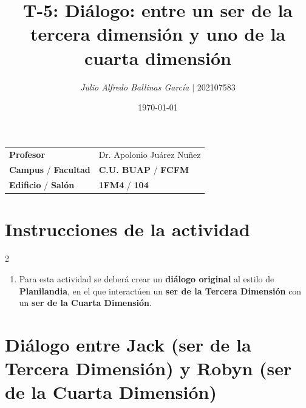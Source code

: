 \documentclass{article}
\title{ \textcolor{Tarawera}{\textbf{T-\textcolor{Sun}{\textbf{5}}}}: \textcolor{Apple Green}{\textbf{\textcolor{orange(colorwheel)}{\textbf{Diálogo}}: entre un ser de la \textcolor{Cinnabar}{\textbf{tercera dimensión}} y uno de la \textcolor{Tuscany}{\textbf{cuarta dimensión}}}}}
\author{\emph{Julio Alfredo Ballinas García} $\boldsymbol{\mid}$ 202107583}
\date{\today}
\begin{document}
\maketitle



\begin{mybox}
	\noindent\begin{tabular}{@{}ll}
		{\bfseries{Profesor}} & Dr. Apolonio Juárez Nuñez\\
		\textcolor{prussianblue}{\bfseries{Campus}} / \textcolor{trueblue}{\bfseries{Facultad}}  & \textcolor{prussianblue}{\bfseries{C.U. BUAP}} /  \textcolor{trueblue}{\bfseries{FCFM}} \\
		\textcolor{prussianblue}{\bfseries{Edificio}} /  \textcolor{trueblue}{\bfseries{Salón}}    & 	\textcolor{prussianblue}{\bfseries{1FM4}} /  \textcolor{trueblue}{\bfseries{104}}   
	\end{tabular} 
\end{mybox} \vspace{1cm}

\section*{Instrucciones de la actividad}

\setlength{\columnsep}{2cm}
\begin{multicols}{2} %
	\begin{enumerate}[label={{\textcolor{trueblue}{\textbf{Ej}. \arabic*.0}}}, start=1]
	\item Para esta actividad se deberá crear un \textbf{diálogo original} al estilo de 
	\textcolor{orange(colorwheel)}{\textbf{Planilandia}}, en el que interactúen un 
	\textbf{ser de la Tercera Dimensión} con un \textbf{ser de la Cuarta Dimensión}.
	\end{enumerate}
\end{multicols}


\vspace{2cm}


\tableofcontents  \vspace{2cm}

\section*{\textcolor{Tuscany}{Diálogo entre Jack (ser de la Tercera Dimensión) y Robyn (ser de la Cuarta Dimensión)}}
\end{document}
